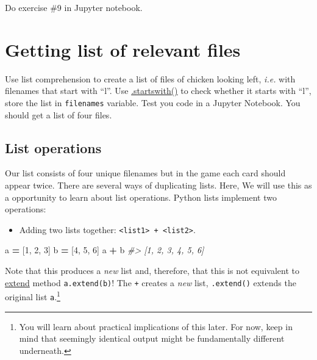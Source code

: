 \documentclass[
]{book}
\newenvironment{Shaded}{\begin{snugshade}}{\end{snugshade}}
\newcommand{\CommentTok}[1]{\textcolor[rgb]{0.56,0.35,0.01}{\textit{#1}}}
\newcommand{\DecValTok}[1]{\textcolor[rgb]{0.00,0.00,0.81}{#1}}
\newcommand{\NormalTok}[1]{#1}
\newcommand{\OperatorTok}[1]{\textcolor[rgb]{0.81,0.36,0.00}{\textbf{#1}}}
\providecommand{\tightlist}{%
  \setlength{\itemsep}{0pt}\setlength{\parskip}{0pt}}
\begin{document}
Do exercise \#9 in Jupyter notebook.

\hypertarget{getting-list-of-relevant-files}{%
\section{Getting list of relevant files}\label{getting-list-of-relevant-files}}

Use list comprehension to create a list of files of chicken looking left, \emph{i.e.} with filenames that start with ``l''. Use \href{https://docs.python.org/3/library/stdtypes.html\#str.startswith}{.startswith()} to check whether it starts with ``l'', store the list in \texttt{filenames} variable. Test you code in a Jupyter Notebook. You should get a list of four files.

\hypertarget{list-operations}{%
\subsection{List operations}\label{list-operations}}

Our list consists of four unique filenames but in the game each card should appear twice. There are several ways of duplicating lists. Here, We will use this as a opportunity to learn about list operations. Python lists implement two operations:

\begin{itemize}
\tightlist
\item
  Adding two lists together: \texttt{\textless{}list1\textgreater{}\ +\ \textless{}list2\textgreater{}}.
\end{itemize}

\begin{Shaded}
\begin{Highlighting}[]
\NormalTok{a }\OperatorTok{=}\NormalTok{ [}\DecValTok{1}\NormalTok{, }\DecValTok{2}\NormalTok{, }\DecValTok{3}\NormalTok{]}
\NormalTok{b }\OperatorTok{=}\NormalTok{ [}\DecValTok{4}\NormalTok{, }\DecValTok{5}\NormalTok{, }\DecValTok{6}\NormalTok{]}
\NormalTok{a }\OperatorTok{+}\NormalTok{ b}
\CommentTok{\#\textgreater{} [1, 2, 3, 4, 5, 6]}
\end{Highlighting}
\end{Shaded}

Note that this produces a \emph{new} list and, therefore, that this is not equivalent to \href{https://docs.python.org/3/tutorial/datastructures.html\#more-on-lists}{extend} method \texttt{a.extend(b)}! The \texttt{+} creates a \emph{new} list, \texttt{.extend()} extends the original list \texttt{a}.\footnote{You will learn about practical implications of this later. For now, keep in mind that seemingly identical output might be fundamentally different underneath.}
\end{document}
